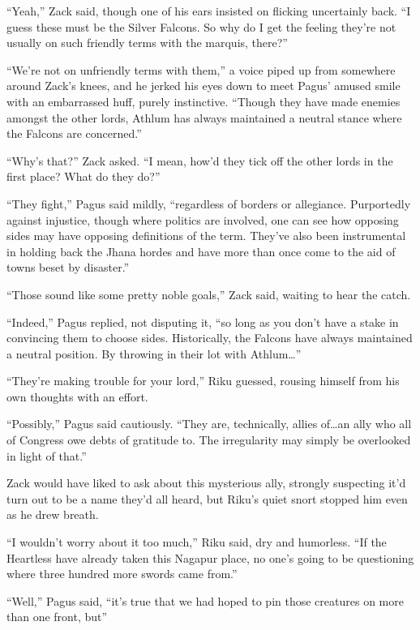 ``Yeah,'' Zack said, though one of his ears insisted on flicking uncertainly back. ``I guess these must be the Silver Falcons. So why do I get the feeling they're not usually on such friendly terms with the marquis, there?''

``We're not on unfriendly terms with them,'' a voice piped up from somewhere around Zack's knees, and he jerked his eyes down to meet Pagus' amused smile with an embarrassed huff, purely instinctive. ``Though they have made enemies amongst the other lords, Athlum has always maintained a neutral stance where the Falcons are concerned.''

``Why's that?'' Zack asked. ``I mean, how'd they tick off the other lords in the first place? What do they do?''

``They fight,'' Pagus said mildly, ``regardless of borders or allegiance. Purportedly against injustice, though where politics are involved, one can see how opposing sides may have opposing definitions of the term. They've also been instrumental in holding back the Jhana hordes and have more than once come to the aid of towns beset by disaster.''

``Those sound like some pretty noble goals,'' Zack said, waiting to hear the catch.

``Indeed,'' Pagus replied, not disputing it, ``so long as you don't have a stake in convincing them to choose sides. Historically, the Falcons have always maintained a neutral position. By throwing in their lot with Athlum\ldots ''

``They're making trouble for your lord,'' Riku guessed, rousing himself from his own thoughts with an effort.

``Possibly,'' Pagus said cautiously. ``They are, technically, allies of\ldots an ally who all of Congress owe debts of gratitude to. The irregularity may simply be overlooked in light of that.''

Zack would have liked to ask about this mysterious ally, strongly suspecting it'd turn out to be a name they'd all heard, but Riku's quiet snort stopped him even as he drew breath.

``I wouldn't worry about it too much,'' Riku said, dry and humorless. ``If the Heartless have already taken this Nagapur place, no one's going to be questioning where three hundred more swords came from.''

``Well,'' Pagus said, ``it's true that we had hoped to pin those creatures on more than one front, but\textemdash ''

